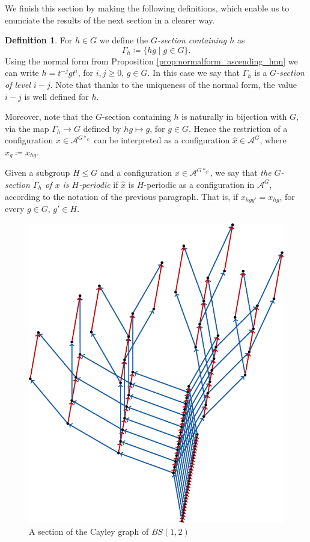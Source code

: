 \documentclass[letterpaper,11pt,reqno]{amsart}
\theoremstyle{plain}
\theoremstyle{definition}
\newtheorem{definition}{Definition}[section]
\begin{document}
We finish this section by making the following definitions, which enable us to enunciate the results of the next section in a clearer way.
\begin{definition}
	For $h\in G$ we define the \textit{$G$-section containing $h$} as
	$$
	\Gamma_{h}\coloneqq \{hg\mid g\in G \}.
	$$
	Using the normal form from Proposition \ref{prop:normalform_ascending_hnn} we can write $h=t^{-j}gt^i$, for $i,j\ge 0$, $g\in G$. In this case we say that $\Gamma_h$ is a \textit{$G$-section of level $i-j$}. Note that thanks to the uniqueness of the normal form, the value $i-j$ is well defined for $h$.
	
	Moreover, note that the $G$-section containing $h$ is naturally in bijection with $G$, via the map $\Gamma_h\to G$ defined by $hg\mapsto g$, for $g\in G$. Hence the restriction of a configuration $x\in \mathcal{A}^{G*_{\psi}}$ can be interpreted as a configuration $\hat{x}\in \mathcal{A}^{G}$, where $\hat{x}_{g}\coloneqq x_{hg}$.
	
	Given a subgroup $H\leqslant G$ and a configuration $x\in \mathcal{A}^{G*_{\psi}}$, we say that \textit{the $G$-section $\Gamma_h$ of $x$ is $H$-periodic} if $\hat{x}$ is $H$-periodic as a configuration in $\mathcal{A}^{G}$, according to the notation of the previous paragraph. That is, if $x_{hgg'}=x_{hg}$,  for every $g\in G$, $g'\in H$.
\end{definition}
\begin{figure}[h]
	\centering
	\includegraphics[scale=0.8]{bs_section.pdf}
	\caption{A section of the Cayley graph of $BS(1,2)$}
	\label{fig:section_cayley_graph_bs}
\end{figure}
\end{document}
